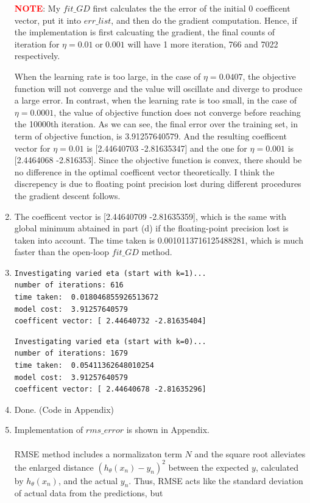 \documentclass[11pt]{article}
\begin{document}
\begin{enumerate}[label=(\alph*)]
    \textbf{\textcolor{red}{NOTE}}: My $fit\_GD$ first calculates the the error of the initial 0 coefficent vector, put it into $err\_list$, and then do the gradient computation. Hence, if the implementation is first calcuating the gradient, the final counts of iteration for $\eta = 0.01\;\text{or}\;0.001$ will have 1 more iteration, 766 and 7022 respectively.

    When the learning rate is too large, in the case of $\eta = 0.0407$, the objective function will not converge and the value will oscillate and diverge to produce a large error. In contrast, when the learning rate is too small, in the case of $\eta = 0.0001$, the value of objective function does not converge before reaching the 10000th iteration. As we can see, the final error over the training set, in term of objective function, is 3.91257640579. And the resulting coefficent vector for $\eta = 0.01$ is [2.44640703 -2.81635347] and the one for $\eta = 0.001$ is [2.4464068 -2.816353]. Since the objective function is convex, there should be no difference in the optimal coefficent vector theoretically. I think the discrepency is due to floating point precision lost during different procedures the gradient descent follows.

\item 
    The coefficent vector is [2.44640709 -2.81635359], which is the same with global minimum abtained in part (d) if the floating-point precision lost is taken into account. The time taken is 0.0010113716125488281, which is much faster than the open-loop $fit\_GD$ method.\\

\item 
    \begin{verbatim}
Investigating varied eta (start with k=1)...
number of iterations: 616
time taken:  0.018046855926513672
model cost:  3.91257640579
coefficent vector: [ 2.44640732 -2.81635404]
    \end{verbatim}
    \begin{verbatim}
Investigating varied eta (start with k=0)...
number of iterations: 1679
time taken:  0.05411362648010254
model cost:  3.91257640579
coefficent vector: [ 2.44640678 -2.81635296]
    \end{verbatim}

\item 
    Done. (Code in Appendix)

\item 
    Implementation of $rms\_error$ is shown in Appendix.\\\\
    RMSE method includes a normalizaton term $N$ and the square root alleviates the enlarged distance $(h_\theta(x_n)-y_n)^2$ between the expected $y$, calculated by $h_\theta(x_n)$, and the actual $y_n$. Thus, RMSE acts like the standard deviation of actual data from the predictions, but 


\end{enumerate}
\end{document}
